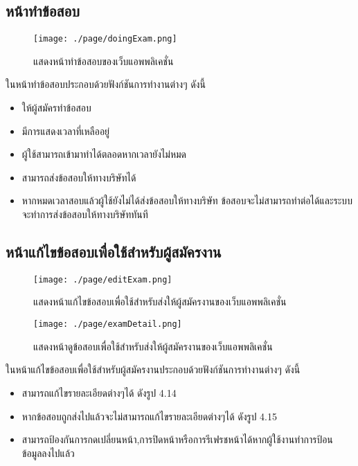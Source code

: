 \subsection{หน้าทำข้อสอบ}
\begin{figure}[H]
  \centering
  \texttt{[image: ./page/doingExam.png]}
  \caption{แสดงหน้าทำข้อสอบของเว็บแอพพลิเคชั่น}
  \label{Fig:doingExam}
\end{figure}
ในหน้าทำข้อสอบประกอบด้วยฟังก์ชันการทำงานต่างๆ ดังนี้
\begin{itemize}
  \item ให้ผู้สมัครทำข้อสอบ
  \item มีการแสดงเวลาที่เหลืออยู่
  \item ผู้ใช้สามารถเข้ามาทำได้ตลอดหากเวลายังไม่หมด
  \item สามารถส่งข้อสอบให้ทางบริษัทได้
  \item หากหมดเวลาสอบแล้วผู้ใช้ยังไม่ได้ส่งข้อสอบให้ทางบริษัท ข้อสอบจะไม่สามารถทำต่อได้และระบบจะทำการส่งข้อสอบให้ทางบริษัททันที
\end{itemize}

\subsection{หน้าแก้ไขข้อสอบเพื่อใช้สำหรับผู้สมัครงาน}
\begin{figure}[H]
  \centering
  \texttt{[image: ./page/editExam.png]}
  \caption{แสดงหน้าแก้ไขข้อสอบเพื่อใช้สำหรับส่งให้ผู้สมัครงานของเว็บแอพพลิเคชั่น}
  \label{Fig:editExam}
\end{figure}
\begin{figure}[H]
  \centering
  \texttt{[image: ./page/examDetail.png]}
  \caption{แสดงหน้าดูข้อสอบเพื่อใช้สำหรับส่งให้ผู้สมัครงานของเว็บแอพพลิเคชั่น}
  \label{Fig:examDetail}
\end{figure}
ในหน้าแก้ไขข้อสอบเพื่อใช้สำหรับผู้สมัครงานประกอบด้วยฟังก์ชันการทำงานต่างๆ ดังนี้
\begin{itemize}
    \item สามารถแก้ไขรายละเอียดต่างๆได้ ดังรูป 4.14
    \item หากข้อสอบถูกส่งไปแล้วจะไม่สามารถแก้ไขรายละเอียดต่างๆได้ ดังรูป 4.15
    \item สามารถป้องกันการกดเปลี่ยนหน้า,การปิดหน้าหรือการรีเฟรชหน้าได้หากผู้ใช้งานทําการป้อน ข้อมูลลงไปแล้ว
\end{itemize}

